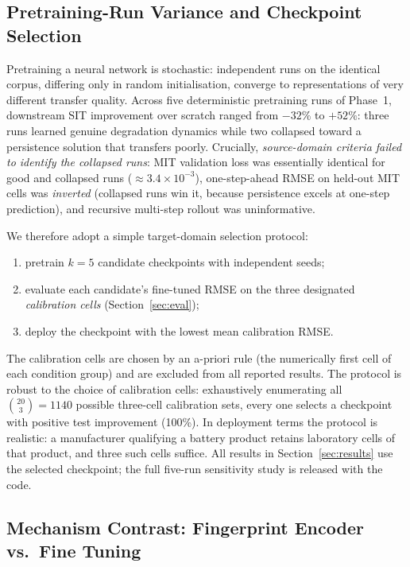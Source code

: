 \subsection{Pretraining-Run Variance and Checkpoint Selection}\label{sec:selection}

Pretraining a neural network is stochastic: independent runs on the identical
corpus, differing only in random initialisation, converge to representations of
very different transfer quality.
Across five deterministic pretraining runs of Phase~1, downstream SIT
improvement over scratch ranged from $-32\%$ to $+52\%$: three runs learned
genuine degradation dynamics while two collapsed toward a persistence
solution that transfers poorly.
Crucially, \emph{source-domain criteria failed to identify the collapsed
runs}: MIT validation loss was essentially identical for good and collapsed
runs (${\approx}3.4\times10^{-3}$), one-step-ahead RMSE on held-out MIT cells
was \emph{inverted} (collapsed runs win it, because persistence excels at
one-step prediction), and recursive multi-step rollout was uninformative.

We therefore adopt a simple target-domain selection protocol:
\begin{enumerate}
  \item pretrain $k=5$ candidate checkpoints with independent seeds;
  \item evaluate each candidate's fine-tuned RMSE on the three designated
        \emph{calibration cells} (Section~\ref{sec:eval});
  \item deploy the checkpoint with the lowest mean calibration RMSE.
\end{enumerate}
The calibration cells are chosen by an a-priori rule (the numerically first
cell of each condition group) and are excluded from all reported results.
The protocol is robust to the choice of calibration cells: exhaustively
enumerating all $\binom{20}{3}=1140$ possible three-cell calibration sets,
every one selects a checkpoint with positive test improvement (100\%).
In deployment terms the protocol is realistic: a manufacturer qualifying a
battery product retains laboratory cells of that product, and three such
cells suffice.
All results in Section~\ref{sec:results} use the selected checkpoint; the
full five-run sensitivity study is released with the code.

\subsection{Mechanism Contrast: Fingerprint Encoder vs.\ Fine Tuning}\label{sec:mechanism}

